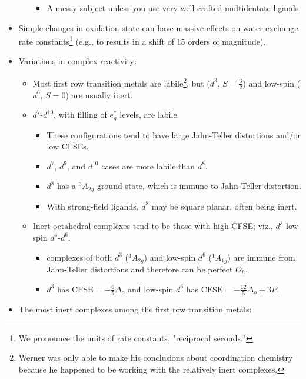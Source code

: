 \documentclass[../notes.tex]{subfiles}
\begin{document}
\begin{itemize}
\begin{enumerate}
\begin{itemize}
            \item A messy subject unless you use very well crafted multidentate ligands.
        \end{itemize}
    \end{enumerate}
    \item Simple changes in oxidation state can have massive effects on water exchange rate constants\footnote{We pronounce the units of rate constants, "reciprocal seconds."} (e.g.,  to  results in a shift of 15 orders of magnitude).
    \item Variations in complex reactivity:
    \begin{itemize}
        \item Most first row transition metals are labile\footnote{Werner was only able to make his conclusions about coordination chemistry because he happened to be working with the relatively inert  complexes.}, but  ($d^3$, $S=\frac{3}{2}$) and low-spin  ($d^6$, $S=0$) are usually inert.
        \item $d^7$-$d^{10}$, with filling of $e_g^*$ levels, are labile.
        \begin{itemize}
            \item These configurations tend to have large Jahn-Teller distortions and/or low CFSEs.
            \item $d^7$, $d^9$, and $d^{10}$ cases are more labile than $d^8$.
            \item $d^8$ has a ${}^3A_{2g}$ ground state, which is immune to Jahn-Teller distortion.
            \item With strong-field ligands, $d^8$ may be square planar, often being inert.
        \end{itemize}
        \item Inert octahedral complexes tend to be those with high CFSE; viz., $d^3$ low-spin $d^4$-$d^6$.
        \begin{itemize}
            \item {} complexes of both $d^3$ (${}^4A_{2g}$) and low-spin $d^6$ (${}^1A_{1g}$) are immune from Jahn-Teller distortions and therefore can be perfect $O_h$.
            \item {} $d^3$ has $\text{CFSE}=-\frac{6}{5}\Delta_o$ and low-spin $d^6$ has $\text{CFSE}=-\frac{12}{5}\Delta_o+3P$.
        \end{itemize}
    \end{itemize}
    \item The most inert complexes among the first row transition metals:

\end{itemize}
\end{document}

